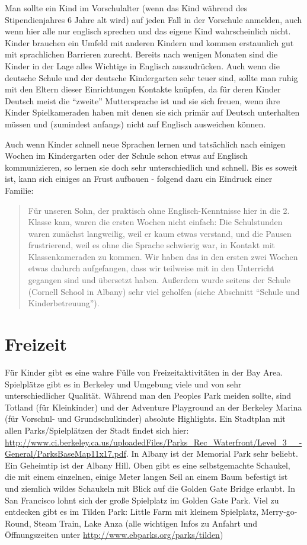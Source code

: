 \documentclass[a4paper]{scrreprt}
\begin{document}
Man sollte ein Kind im Vorschulalter (wenn das Kind während des Stipendienjahres 6 Jahre alt wird) auf jeden Fall in der Vorschule anmelden, auch wenn hier alle nur englisch sprechen und das eigene Kind wahrscheinlich nicht. Kinder brauchen ein Umfeld mit anderen Kindern und kommen erstaunlich gut mit sprachlichen Barrieren zurecht. Bereits nach wenigen Monaten sind die Kinder in der Lage alles Wichtige in Englisch auszudrücken. Auch wenn die deutsche Schule und der deutsche Kindergarten sehr teuer sind, sollte man ruhig mit den Eltern dieser Einrichtungen Kontakte knüpfen, da für deren Kinder Deutsch meist die "`zweite"' Muttersprache ist und sie sich freuen, wenn ihre Kinder Spielkameraden haben mit denen sie sich primär auf Deutsch unterhalten müssen und (zumindest anfangs) nicht auf Englisch ausweichen können.

Auch wenn Kinder schnell neue Sprachen lernen und tatsächlich nach einigen Wochen im Kindergarten oder der Schule schon etwas auf Englisch kommunizieren, so lernen sie doch sehr unterschiedlich und schnell. Bis es soweit ist, kann sich einiges an Frust aufbauen - folgend dazu ein Eindruck einer Familie:

\begin{verse}
Für unseren Sohn, der praktisch ohne Englisch-Kenntnisse hier in die 2. Klasse kam, waren die ersten Wochen nicht einfach: Die Schulstunden waren zunächst langweilig, weil er kaum etwas verstand, und die Pausen frustrierend, weil es ohne die Sprache schwierig war, in Kontakt mit Klassenkameraden zu kommen. Wir haben das in den ersten zwei Wochen etwas dadurch aufgefangen, dass wir teilweise mit in den Unterricht gegangen sind und übersetzt haben. Außerdem wurde seitens der Schule (Cornell School in Albany) sehr viel geholfen (siehe Abschnitt "`Schule und Kinderbetreuung"').
\end{verse}

\section{Freizeit}

Für Kinder gibt es eine wahre Fülle von Freizeitaktivitäten in der Bay Area. Spielplätze gibt es in Berkeley und Umgebung viele und von sehr unterschiedlicher Qualität. Während man den Peoples Park meiden sollte, sind Totland (für Kleinkinder) und der Adventure Playground an der Berkeley Marina (für Vorschul- und Grundschulkinder) absolute Highlights. 
Ein Stadtplan mit allen Parks/Spielplätzen der Stadt findet sich hier: \url{http://www.ci.berkeley.ca.us/uploadedFiles/Parks\_Rec\_Waterfront/Level\_3\_\_-General/ParksBaseMap11x17.pdf}.
In Albany ist der Memorial Park sehr beliebt. Ein Geheimtip ist der Albany Hill. Oben gibt es eine selbstgemachte Schaukel, die mit einem einzelnen, einige Meter langen Seil an einem Baum befestigt ist und ziemlich wildes Schaukeln mit Blick auf die Golden Gate Bridge erlaubt. In San Francisco lohnt sich der große Spielplatz im Golden Gate Park. Viel zu entdecken gibt es im Tilden Park:
Little Farm mit kleinem Spielplatz, Merry-go-Round, Steam Train, Lake Anza (alle wichtigen Infos zu Anfahrt und Öffnungszeiten unter \url{http://www.ebparks.org/parks/tilden})
\end{document}
